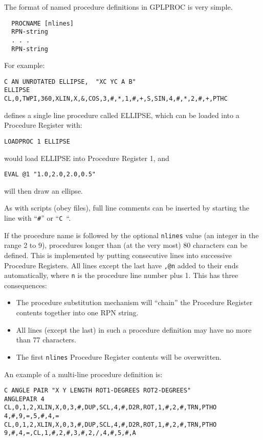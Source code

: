 \documentclass[a4paper,twoside,11pt]{article}
\newcommand{\newpara}{\par\vspace{4mm}\noindent}
\begin{document}
\newpara
The format of named procedure definitions in GPLPROC is very simple.
\begin{lstlisting}
  PROCNAME [nlines]
  RPN-string
  . . .
  RPN-string
\end{lstlisting}

\newpara
For example:
\begin{lstlisting}
C AN UNROTATED ELLIPSE,  "XC YC A B"
ELLIPSE
CL,0,TWPI,360,XLIN,X,&,COS,3,#,*,1,#,+,S,SIN,4,#,*,2,#,+,PTHC
\end{lstlisting}
defines a single line procedure called ELLIPSE, which can be loaded into a Procedure Register
with:
\begin{lstlisting}
LOADPROC 1 ELLIPSE
\end{lstlisting}
would load ELLIPSE into Procedure Register 1, and
\begin{lstlisting}
EVAL @1 "1.0,2.0,2.0,0.5"
\end{lstlisting}
will then draw an ellipse.

\newpara
As with scripts (obey files), full line comments can be inserted by starting the line with
``\texttt{\#}'' or ``\texttt{C }``.

\newpara
If the procedure name is followed by the optional \texttt{nlines} value (an integer in the range 2 to 9),
procedures longer than (at the very most) 80 characters can be defined. This is implemented by putting
consecutive lines into successive Procedure Registers. All lines except the last have \texttt{,@n} added to their
ends automatically, where \texttt{n} is the procedure line number plus 1. This has three consequences:
\begin{itemize}
\item The procedure substitution mechanism will ``chain'' the Procedure Register contents together into one
  RPN string.
\item All lines (except the last) in such a procedure definition may have no more than 77 characters.
\item The first \texttt{nlines} Procedure Register contents will be overwritten.
\end{itemize}

\newpara
An example of a multi-line procedure definition is:
\begin{lstlisting}
C ANGLE PAIR "X Y LENGTH ROT1-DEGREES ROT2-DEGREES"
ANGLEPAIR 4
CL,0,1,2,XLIN,X,0,3,#,DUP,SCL,4,#,D2R,ROT,1,#,2,#,TRN,PTHO
4,#,9,=,5,#,4,=
CL,0,1,2,XLIN,X,0,3,#,DUP,SCL,4,#,D2R,ROT,1,#,2,#,TRN,PTHO
9,#,4,=,CL,1,#,2,#,3,#,2,/,4,#,5,#,A
\end{lstlisting}
\end{document}
